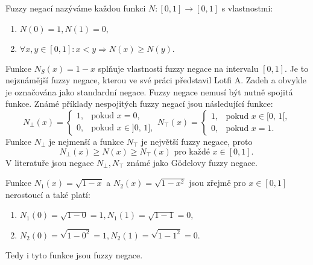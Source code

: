 \begin{definition}
\cite{Kolo} Fuzzy negací nazýváme každou funkci $N:[0, 1] \to [0, 1]$  s vlastnostmi:
    \begin{enumerate}
        \item  $N(0) = 1, N(1) = 0,$
        \item $\forall  x, y \in [0, 1]: x < y \Rightarrow{} N(x) \geq N(y).$
     \end{enumerate}
\end{definition}
     \begin{example}
         Funkce $N_S(x)=1-x$ spl\v nuje vlastnosti fuzzy negace na intervalu $[0,1].$ Je to nejzn\'am\v ej\v s\'i fuzzy negace, kterou ve sv\'e pr\'aci p\v redstavil Lotfi A. Zadeh a obvykle je ozna\v cov\'ana jako standardn\'i negace.   Fuzzy negace nemus\'i b\'yt nutn\v e spojit\'a funkce. Zn\'am\'e p\v r\'iklady nespojit\'ych fuzzy negac\'i jsou n\'asleduj\'ic\'i funkce:
         $$ N_{\bot}(x)=\begin{cases} 1, & \mbox{pokud }x=0, \\
         0, & \mbox{pokud }x\in \mbox{]0, 1]}, \end{cases} 
         N_{\top}(x)=\begin{cases} 1, & \mbox{pokud }x\in \mbox{[0, 1[}, \\
         0, & \mbox{pokud }x=1. \end{cases}$$
         Funkce $N_{\bot}$ je nejmen\v s\'i a funkce $N_{\top}$ je nejv\v et\v s\'i fuzzy negace, proto
         \begin{equation}
        N_{\bot}(x) \geq N(x) \geq N_\top(x)  \mbox{ pro každé } x \in [0, 1]. \
    \end{equation}
    V literatu\v re jsou negace $N_\bot, N_\top$ zn\'am\'e jako Gödelovy fuzzy negace.
    
    Funkce $N_1(x) = \sqrt{1-x}$ a $N_2(x) = \sqrt{1-x^2}$ jsou zřejmě pro $ x \in [0,1]$ nerostoucí a tak\'e plat\'i:
        \begin{enumerate}
            \item $N_1(0) = \sqrt{1-0} = 1, 
                    N_1(1) = \sqrt{1-1} = 0, $
            \item $N_2(0) = \sqrt{1-0^2} = 1,
                    N_2(1) = \sqrt{1-1^2} = 0.$
        \end{enumerate}
         Tedy i tyto funkce jsou fuzzy negace.


\end{example}
